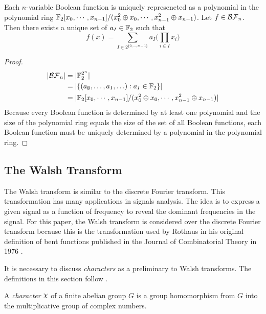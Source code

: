 \begin{theorem}
Each $n$-variable Boolean function is uniquely represeneted as a polynomial
in the polynomial ring $\mathbb{F}_2[x_0,\cdots,x_{n-1}]/ (x_0^2\oplus x_0,\cdots,
x_{n-1}^2 \oplus x_{n-1})$. Let $f\in\mathcal{BF}_n$. Then there exists a unique set
of $a_I\in\mathbb{F}_2$ such that
\begin{equation}\label{eqn:ANF}
  f(x)=\sum_{I\in2^{\{0,\dots,n-1\}}}a_I\bigg(\prod_{i\in I}x_i\bigg)
\end{equation}
\end{theorem}

\begin{proof}
  \begin{align*}
  \lvert\mathcal{BF}_n\rvert
    &= \lvert \mathbb{F}_2^{2^n} \rvert \\
    &= \lvert \{(a_{\emptyset},\ldots,a_I,\ldots):a_I\in\mathbb{F}_2\} \rvert \\
    &= \lvert \mathbb{F}_2[x_0,\cdots,x_{n-1}]/ (x_0^2\oplus x_0,\cdots,
    x_{n-1}^2 \oplus x_{n-1})\rvert
  \end{align*}
  Because every Boolean function is determined by at least one polynomial
  and the size of the polynomial ring equals the size of the set of all
  Boolean functions, each Boolean function must be uniquely determined by a
  polynomial in the polynomial ring.
\end{proof}

\subsection{The Walsh Transform}
\par The Walsh transform is similar to the discrete Fourier transform.
This transformation has many applications in signals
analysis. The idea is to express a given signal as a function of frequency
to reveal the dominant frequencies in the signal. For this paper, the Walsh
transform is considered over the discrete Fourier transform because this is
the transformation used by Rothaus in his original definition of bent
functions published in the Journal of Combinatorial Theory in 1976
\cite{art:r76}. 

\par It is necessary to discuss \textit{characters} as a preliminary to Walsh
transforms. The definitions in this section follow \cite{bk:lsy11}.

\begin{definition}
  A {\em character} $\Chi$ of a finite abelian group $G$ is a group
  homomorphism from $G$ into the multiplicative group of complex numbers.
\end{definition}

